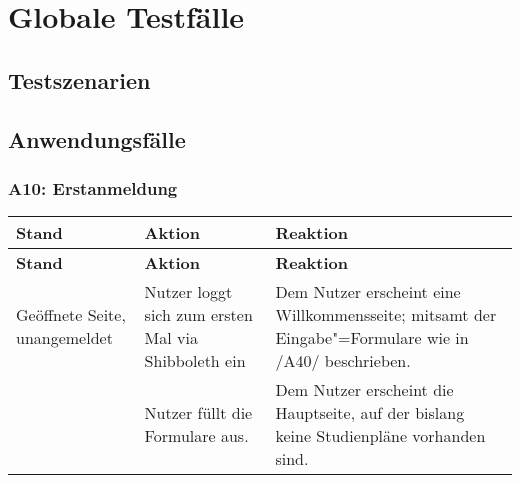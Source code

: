 \section{Globale Testfälle}

\renewcommand{\arraystretch}{1.24}  %
\newenvironment{usecase}[1]{
	\subsubsection*{#1} 
	\hspace{1pt}\vspace{-2\baselineskip}  %
	\begin{longtable}{|>{\hspace{0pt}}p{.18\linewidth}|p{.34\linewidth}|p{.44\linewidth}|}   %
		\hline
		\textbf{Stand} & \textbf{Aktion} & \textbf{Reaktion} \\
		\hline 
		\endfirsthead
		
		\hline
		\textbf{Stand} & \textbf{Aktion} & \textbf{Reaktion} \\
		\endhead
		
		\hline
		\endlastfoot
}{
	\end{longtable}
}





\subsection{Testszenarien}






\subsection{Anwendungsfälle}

\begin{center}
	\resizebox{\textwidth}{!} {
		
	}
\end{center}



\begin{usecase}{A10: Erstanmeldung}
	Geöffnete Seite, unangemeldet
	& Nutzer loggt sich zum ersten Mal via Shibboleth ein
	& Dem Nutzer erscheint eine Willkommensseite; mitsamt der Eingabe"=Formulare wie in /A40/ beschrieben.\\ 
	\hline
	& Nutzer füllt die Formulare aus.
	& Dem Nutzer erscheint die Hauptseite, auf der bislang keine Studienpläne vorhanden sind. 	
\end{usecase}

